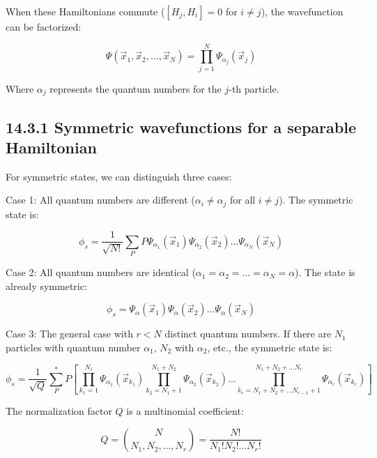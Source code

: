 \documentclass[italian]{HKNdocument}
\begin{document}
When these Hamiltonians commute ($[H_j,H_i]=0$ for $i\neq j$), the wavefunction can be factorized:

\begin{equation*}
\Psi(\vec{x}_1,\vec{x}_2,\ldots,\vec{x}_N)=\prod_{j=1}^{N}\Psi_{\alpha_j}(\vec{x}_j) \tag{14.20}
\end{equation*}

Where $\alpha_j$ represents the quantum numbers for the $j$-th particle.

\subsection*{14.3.1 Symmetric wavefunctions for a separable Hamiltonian}
For symmetric states, we can distinguish three cases:

Case 1: All quantum numbers are different ($\alpha_i\neq\alpha_j$ for all $i\neq j$). The symmetric state is:

\begin{equation*}
\phi_s=\frac{1}{\sqrt{N!}}\sum_P P\Psi_{\alpha_1}(\vec{x}_1)\Psi_{\alpha_2}(\vec{x}_2)\ldots\Psi_{\alpha_N}(\vec{x}_N) \tag{14.21}
\end{equation*}

Case 2: All quantum numbers are identical ($\alpha_1=\alpha_2=\ldots=\alpha_N=\alpha$). The state is already symmetric:

\begin{equation*}
\phi_s=\Psi_{\alpha}(\vec{x}_1)\Psi_{\alpha}(\vec{x}_2)\ldots\Psi_{\alpha}(\vec{x}_N) \tag{14.22}
\end{equation*}

Case 3: The general case with $r<N$ distinct quantum numbers. If there are $N_1$ particles with quantum number $\alpha_1$, $N_2$ with $\alpha_2$, etc., the symmetric state is:

\begin{equation*}
\phi_s=\frac{1}{\sqrt{Q}}\sum_P^* P\left[\prod_{k_1=1}^{N_1}\Psi_{\alpha_1}(\vec{x}_{k_1})\prod_{k_2=N_1+1}^{N_1+N_2}\Psi_{\alpha_2}(\vec{x}_{k_2})\ldots\prod_{k_r=N_1+N_2+\ldots N_{r-1}+1}^{N_1+N_2+\ldots N_r}\Psi_{\alpha_r}(\vec{x}_{k_r})\right] \tag{14.23}
\end{equation*}

The normalization factor $Q$ is a multinomial coefficient:

\begin{equation*}
Q=\binom{N}{N_1,N_2,\ldots,N_r}=\frac{N!}{N_1!N_2!\ldots N_r!} \tag{14.24}
\end{equation*}
\end{document}

